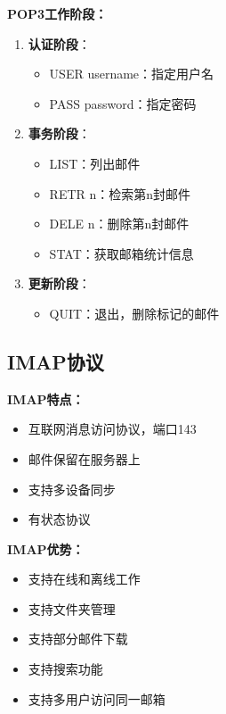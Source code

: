 \documentclass[lang=cn,newtx,10pt,scheme=chinese]{../../elegantbook}
\begin{document}
\textbf{POP3工作阶段：}
\begin{enumerate}
  \item \textbf{认证阶段}：
    \begin{itemize}
      \item USER username：指定用户名
      \item PASS password：指定密码
    \end{itemize}
  
  \item \textbf{事务阶段}：
    \begin{itemize}
      \item LIST：列出邮件
      \item RETR n：检索第n封邮件
      \item DELE n：删除第n封邮件
      \item STAT：获取邮箱统计信息
    \end{itemize}
  
  \item \textbf{更新阶段}：
    \begin{itemize}
      \item QUIT：退出，删除标记的邮件
    \end{itemize}
\end{enumerate}

\subsection{IMAP协议}

\textbf{IMAP特点：}
\begin{itemize}
  \item 互联网消息访问协议，端口143
  \item 邮件保留在服务器上
  \item 支持多设备同步
  \item 有状态协议
\end{itemize}

\textbf{IMAP优势：}
\begin{itemize}
  \item 支持在线和离线工作
  \item 支持文件夹管理
  \item 支持部分邮件下载
  \item 支持搜索功能
  \item 支持多用户访问同一邮箱
\end{itemize}
\end{document}
